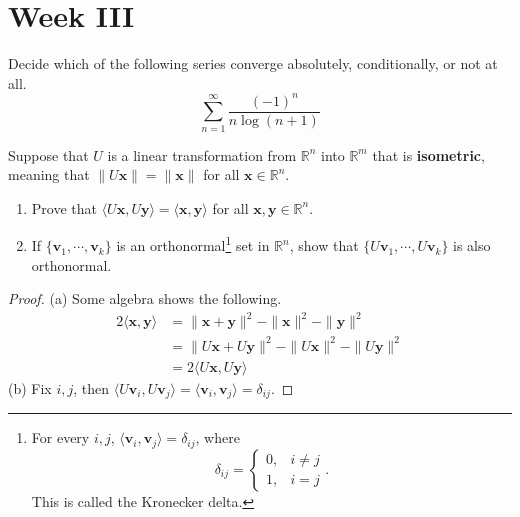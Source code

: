 \documentclass[../main.tex]{subfiles}
\begin{document}
\section{Week III}

\begin{problem}[\S3.3 B]
    Decide which of the following series converge absolutely, conditionally, or not at all.
    \[
        \sum_{n = 1}^\infty \frac{(-1)^n}{n\log(n + 1)}
    \]
\end{problem}


\begin{problem}[\S4.1 I]
Suppose that $U$ is a linear transformation from $\mathbb{R}^n$ into $\mathbb{R}^m$ that is \textbf{isometric}, meaning that $\|U \mathbf{x}\| = \|\mathbf{x}\|$ for all $\mathbf{x} \in \mathbb{R}^n$.
\begin{enumerate}
    \item[(a)] Prove that $\langle U\mathbf{x}, U \mathbf{y} \rangle = \langle \mathbf{x}, \mathbf{y} \rangle$ for all $\mathbf{x}, \mathbf{y} \in \mathbb{R}^n$.
    \item[(b)] If $\{ \mathbf{v}_1, \cdots, \mathbf{v}_k \}$ is an orthonormal\footnote{
        For every $i, j$, $\langle \mathbf{v}_i, \mathbf{v}_j \rangle = \delta_{ij}$, where
        \[
            \delta_{ij} = \begin{cases}
                0, & i \ne j \\
                1, & i = j
            \end{cases}.
        \]
        This is called the Kronecker delta.
    }
        set in $\mathbb{R}^n$, show that $\{ U\mathbf{v}_1, \cdots, U\mathbf{v}_k \}$ is also orthonormal.
\end{enumerate}
\end{problem}

\begin{proof}
    (a) Some algebra shows the following.
    \begin{align*}
        2\langle \mathbf{x}, \mathbf{y} \rangle &= \|\mathbf{x} + \mathbf{y}\|^2 - \|\mathbf{x}\|^2 - \|\mathbf{y}\|^2 \\
         &= \|U\mathbf{x} + U\mathbf{y}\|^2 - \|U\mathbf{x}\|^2 - \|U\mathbf{y}\|^2 \\
         &= 2\langle U\mathbf{x}, U\mathbf{y} \rangle
    \end{align*}
    (b) Fix $i, j$, then $\langle U\mathbf{v}_i, U\mathbf{v}_j \rangle = \langle \mathbf{v}_i, \mathbf{v}_j \rangle = \delta_{ij}$.
\end{proof}
\end{document}
